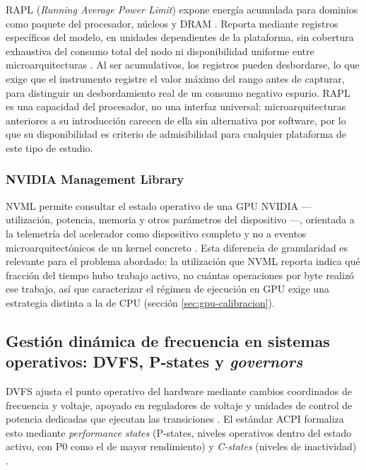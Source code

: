 \documentclass[12pt,oneside,spanish]{book}
\begin{document}
RAPL (\textit{Running Average Power Limit}) expone energía acumulada para dominios como paquete del procesador, núcleos y DRAM \cite{David2010,Thamm2025}. Reporta mediante registros específicos del modelo, en unidades dependientes de la plataforma, sin cobertura exhaustiva del consumo total del nodo ni disponibilidad uniforme entre microarquitecturas \cite{Thamm2025}. Al ser acumulativos, los registros pueden desbordarse, lo que exige que el instrumento registre el valor máximo del rango antes de capturar, para distinguir un desbordamiento real de un consumo negativo espurio. RAPL es una capacidad del procesador, no una interfaz universal: microarquitecturas anteriores a su introducción carecen de ella sin alternativa por software, por lo que su disponibilidad es criterio de admisibilidad para cualquier plataforma de este tipo de estudio.

\subsubsection{NVIDIA Management Library}

NVML permite consultar el estado operativo de una GPU NVIDIA --- utilización, potencia, memoria y otros parámetros del dispositivo \cite{NVML2026} ---, orientada a la telemetría del acelerador como dispositivo completo y no a eventos microarquitectónicos de un kernel concreto \cite{Calore2017,NVML2026}. Esta diferencia de granularidad es relevante para el problema abordado: la utilización que NVML reporta indica qué fracción del tiempo hubo trabajo activo, no cuántas operaciones por byte realizó ese trabajo, así que caracterizar el régimen de ejecución en GPU exige una estrategia distinta a la de CPU (sección \ref{sec:gpu-calibracion}).

\subsection{Gestión dinámica de frecuencia en sistemas operativos: DVFS, P-states y \textit{governors}}

DVFS ajusta el punto operativo del hardware mediante cambios coordinados de frecuencia y voltaje, apoyado en reguladores de voltaje y unidades de control de potencia dedicadas que ejecutan las transiciones \cite{Hebbar2022}. El estándar ACPI formaliza esto mediante \textit{performance states} (P-states, niveles operativos dentro del estado activo, con P0 como el de mayor rendimiento) y \textit{C-states} (niveles de inactividad) \cite{Hebbar2022,Gregg2020}.
\end{document}
